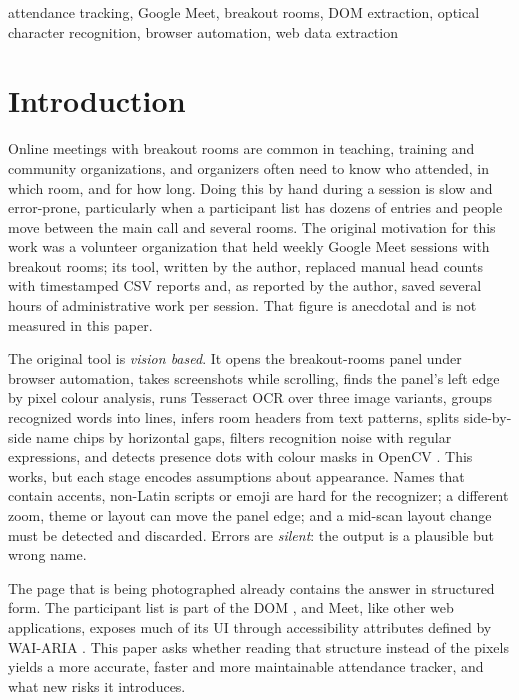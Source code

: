 \documentclass[conference]{IEEEtran}
\begin{document}
\begin{IEEEkeywords}
attendance tracking, Google Meet, breakout rooms, DOM extraction, optical character recognition, browser automation, web data extraction
\end{IEEEkeywords}

\section{Introduction}
Online meetings with breakout rooms are common in teaching, training and community organizations, and organizers often need to know who attended, in which room, and for how long. Doing this by hand during a session is slow and error-prone, particularly when a participant list has dozens of entries and people move between the main call and several rooms. The original motivation for this work was a volunteer organization that held weekly Google Meet sessions with breakout rooms; its tool, written by the author, replaced manual head counts with timestamped CSV reports and, as reported by the author, saved several hours of administrative work per session. That figure is anecdotal and is not measured in this paper.

The original tool is \emph{vision based}. It opens the breakout-rooms panel under browser automation, takes screenshots while scrolling, finds the panel's left edge by pixel colour analysis, runs Tesseract OCR \cite{smith2007tesseract} over three image variants, groups recognized words into lines, infers room headers from text patterns, splits side-by-side name chips by horizontal gaps, filters recognition noise with regular expressions, and detects presence dots with colour masks in OpenCV \cite{bradski2000opencv}. This works, but each stage encodes assumptions about appearance. Names that contain accents, non-Latin scripts or emoji are hard for the recognizer; a different zoom, theme or layout can move the panel edge; and a mid-scan layout change must be detected and discarded. Errors are \emph{silent}: the output is a plausible but wrong name.

The page that is being photographed already contains the answer in structured form. The participant list is part of the DOM \cite{whatwg2024dom}, and Meet, like other web applications, exposes much of its UI through accessibility attributes defined by WAI-ARIA \cite{w3c2023aria}. This paper asks whether reading that structure instead of the pixels yields a more accurate, faster and more maintainable attendance tracker, and what new risks it introduces.
\end{document}
